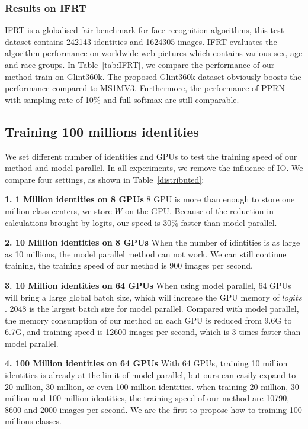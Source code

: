 \documentclass[letterpaper]{article} \usepackage{style/aaai21}  \usepackage{times}  \usepackage{helvet} \usepackage{courier}  \usepackage[hyphens]{url}  \usepackage{graphicx} \usepackage{color}
\begin{document}
\subsubsection{Results on IFRT}
IFRT is a globalised fair benchmark for face recognition algorithms, this test dataset contains 242143 identities and 1624305 images. IFRT evaluates the algorithm performance on worldwide web pictures which contains various sex, age and race groups. In Table~\ref{tab:IFRT}, we compare the performance of our method train on Glint360k. The proposed Glint360k dataset obviously boosts the performance compared to MS1MV3. Furthermore, the performance of PPRN with sampling rate of 10\% and full softmax are still comparable.

\subsection{Training 100 millions identities}
We set different number of identities and GPUs to test the training speed of our method and model parallel. In all experiments, we remove the influence of IO. We compare four settings, as shown in Table~\ref{distributed}:  

\noindent \textbf{1. 1 Million identities on 8 GPUs}  
8 GPU is more than enough to store one million class centers, we store $W$ on the GPU. Because of the reduction in calculations brought by logits, our speed is 30\% faster than model parallel.    

\noindent \textbf{2. 10 Million identities on 8 GPUs}  
When the number of idintities is as large as 10 millions, the model parallel method can not work. We can still continue training, the training speed of our method is 900 images per second.

\noindent \textbf{3. 10 Million identities on 64 GPUs}  
When using model parallel, 64 GPUs will bring a large global batch size, which will increase the GPU memory of $logits$. 2048 is the largest batch size for model parallel. Compared with model parallel, the memory consumption of our method on each GPU is reduced from 9.6G to 6.7G, and training speed is 12600 images per second, which is 3 times faster than model parallel.  

\noindent \textbf{4. 100 Million identities on 64 GPUs}
With 64 GPUs, training 10 million identities is already at the limit of model parallel, but ours can easily expand to 20 million, 30 million, or even 100 million identities. when training 20 million, 30 million and 100 million identities, the training speed of our method are 10790, 8600 and 2000 images per second. We are the first to propose how to training 100 millions classes. 
\end{document}
